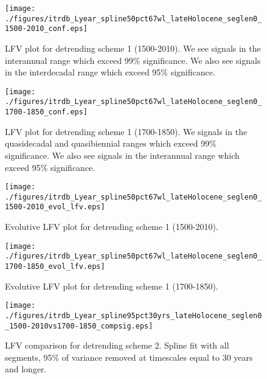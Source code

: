 \documentclass[phd,tocprelim]{cornell}
\begin{document}
\begin{figure}[!tbp]
\centering
\begin{minipage}[b]{0.45\textwidth}
\texttt{[image: ./figures/itrdb\_Lyear\_spline50pct67wl\_lateHolocene\_seglen0\_1500-2010\_conf.eps]}

\caption{LFV plot for detrending scheme 1 (1500-2010). We see signals in the interannual range which exceed 99\% significance. We also see signals in the interdecadal range which exceed 95\% significance.}
\label{conf1:1500}

\end{minipage}
\hfill
\begin{minipage}[b]{0.45\textwidth}
\texttt{[image: ./figures/itrdb\_Lyear\_spline50pct67wl\_lateHolocene\_seglen0\_1700-1850\_conf.eps]}
\caption{LFV plot for detrending scheme 1 (1700-1850). We signals in the quasidecadal and quasibiennial ranges which exceed 99\% significance. We also see signals in the interannual range which exceed 95\% significance. }
\label{conf1:1700}
\end{minipage}
\end{figure}

\begin{figure}[!tbp]
\centering
\begin{minipage}[b]{0.45\textwidth}
\texttt{[image: ./figures/itrdb\_Lyear\_spline50pct67wl\_lateHolocene\_seglen0\_1500-2010\_evol\_lfv.eps]}

\caption{Evolutive LFV plot for detrending scheme 1 (1500-2010).}
\label{evol1:1500}

\end{minipage}
\hfill
\begin{minipage}[b]{0.45\textwidth}
\texttt{[image: ./figures/itrdb\_Lyear\_spline50pct67wl\_lateHolocene\_seglen0\_1700-1850\_evol\_lfv.eps]}
\caption{Evolutive LFV plot for detrending scheme 1 (1700-1850).}
\label{evol1:1700}
\end{minipage}
\end{figure}

\begin{figure}[!tbp]
\centering
\texttt{[image: ./figures/itrdb\_Lyear\_spline95pct30yrs\_lateHolocene\_seglen0\_1500-2010vs1700-1850\_compsig.eps]}

\noindent{}

\caption{LFV comparison for detrending scheme 2. Spline fit with all segments, 95\% of variance removed at timescales equal to 30 years and longer.}

\label{compsig2}
\end{figure}
\end{document}
